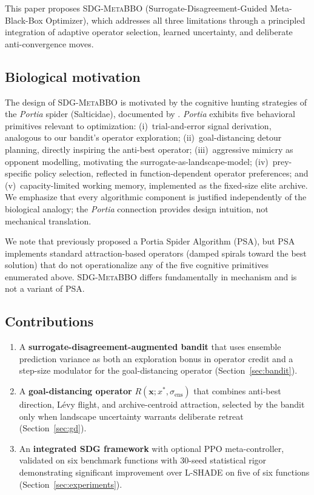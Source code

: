 \documentclass[preprint,12pt,authoryear]{elsarticle}
\newcommand{\sdg}{\textsc{SDG-MetaBBO}}
\newcommand{\xbest}{x^*}
\newcommand{\sigmaens}{\sigma_{\text{ens}}}
\begin{document}
This paper proposes \sdg{} (Surrogate-Disagreement-Guided Meta-Black-Box Optimizer), which addresses all three limitations through a principled integration of adaptive operator selection, learned uncertainty, and deliberate anti-convergence moves.

\subsection{Biological motivation}

The design of \sdg{} is motivated by the cognitive hunting strategies of the \emph{Portia} spider (Salticidae), documented by \citet{Jackson2011}. \emph{Portia} exhibits five behavioral primitives relevant to optimization: (i)~trial-and-error signal derivation, analogous to our bandit's operator exploration; (ii)~goal-distancing detour planning, directly inspiring the anti-best operator; (iii)~aggressive mimicry as opponent modelling, motivating the surrogate-as-landscape-model; (iv)~prey-specific policy selection, reflected in function-dependent operator preferences; and (v)~capacity-limited working memory, implemented as the fixed-size elite archive. We emphasize that every algorithmic component is justified independently of the biological analogy; the \emph{Portia} connection provides design intuition, not mechanical translation.

We note that \citet{Pham2024} previously proposed a Portia Spider Algorithm (PSA), but PSA implements standard attraction-based operators (damped spirals toward the best solution) that do not operationalize any of the five cognitive primitives enumerated above. \sdg{} differs fundamentally in mechanism and is not a variant of PSA.

\subsection{Contributions}

\begin{enumerate}
\item A \textbf{surrogate-disagreement-augmented bandit} that uses ensemble prediction variance as both an exploration bonus in operator credit and a step-size modulator for the goal-distancing operator (Section~\ref{sec:bandit}).

\item A \textbf{goal-distancing operator} $R(\mathbf{x}; \xbest, \sigmaens)$ that combines anti-best direction, L\'evy flight, and archive-centroid attraction, selected by the bandit only when landscape uncertainty warrants deliberate retreat (Section~\ref{sec:gd}).

\item An \textbf{integrated SDG framework} with optional PPO meta-controller, validated on six benchmark functions with 30-seed statistical rigor demonstrating significant improvement over L-SHADE on five of six functions (Section~\ref{sec:experiments}).
\end{enumerate}
\end{document}
